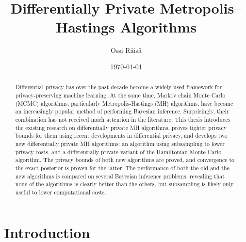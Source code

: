 \documentclass[english,twoside,openright]{HYgraduMLDS}
\title{Differentially Private Metropolis--Hastings Algorithms}
\author{Ossi Räisä}
\date{\today}
\begin{document}
\maketitle


\begin{abstract}
  Differential privacy has over the past decade become a widely used framework
  for privacy-preserving machine learning. At the same time,
  Markov chain Monte Carlo (MCMC) algorithms, particularly Metropolis-Hastings (MH)
  algorithms, have become an increasingly popular method
  of performing Bayesian inference. Surprisingly, their combination has not
  received much attention in the literature. This thesis introduces the
  existing research on differentially private MH algorithms, proves tighter
  privacy bounds for them using recent developments in differential privacy, and
  develops two new differentially private MH algorithms:
  an algorithm using subsampling to lower privacy costs, and
  a differentially private variant of the Hamiltonian Monte
  Carlo algorithm. The privacy bounds of both new algorithms are proved, and
  convergence to the exact posterior is proven for the latter.
  The performance of both the old and the new algorithms is compared on several
  Bayesian inference problems, revealing that none of the algorithms is
  clearly better than the others, but subsampling is likely only useful to lower
  computational costs.
\end{abstract}

\mytableofcontents

\mynomenclature

\chapter{Introduction}
\end{document}
